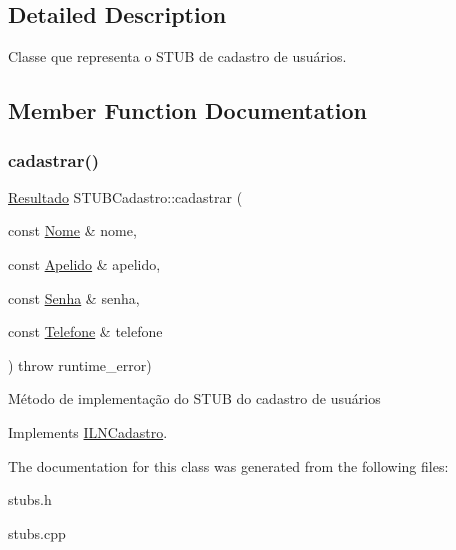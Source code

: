 \subsection{Detailed Description}
Classe que representa o S\+T\+UB de cadastro de usuários. 

\subsection{Member Function Documentation}
\mbox{\label{classSTUBCadastro_ad9c280c37447e41f6d6cc77adacf83a6}} 
\subsubsection{\texorpdfstring{cadastrar()}{cadastrar()}}
{\footnotesize\ttfamily \hyperlink{classResultado}{Resultado} S\+T\+U\+B\+Cadastro\+::cadastrar (\begin{DoxyParamCaption}\item[{const \hyperlink{classNome}{Nome} \&}]{nome,  }\item[{const \hyperlink{classApelido}{Apelido} \&}]{apelido,  }\item[{const \hyperlink{classSenha}{Senha} \&}]{senha,  }\item[{const \hyperlink{classTelefone}{Telefone} \&}]{telefone }\end{DoxyParamCaption}) throw  runtime\+\_\+error) \hspace{0.3cm}{\ttfamily [virtual]}}

Método de implementação do S\+T\+UB do cadastro de usuários 

Implements \hyperlink{classILNCadastro}{I\+L\+N\+Cadastro}.



The documentation for this class was generated from the following files\+:\begin{DoxyCompactItemize}
\item 
stubs.\+h\item 
stubs.\+cpp\end{DoxyCompactItemize}
